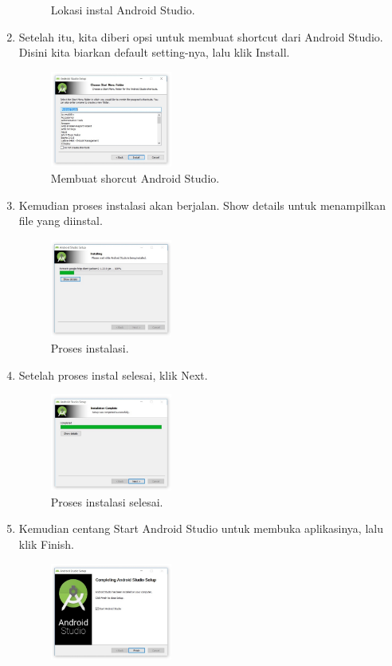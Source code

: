 \begin{enumerate}
\begin{figure}[H]
		\centering
		\caption{Lokasi instal Android Studio.}
	\end{figure}
	\item Setelah itu, kita diberi opsi untuk membuat shortcut dari Android Studio. Disini kita biarkan default setting-nya, lalu klik Install.
	\begin{figure}[H]
		\includegraphics[width=4cm]{figures/installas/4.jpg}
		\centering
		\caption{Membuat shorcut Android Studio.}
	\end{figure}
	\item Kemudian proses instalasi akan berjalan. Show details untuk menampilkan file yang diinstal.
	\begin{figure}[H]
		\includegraphics[width=4cm]{figures/installas/5.jpg}
		\centering
		\caption{Proses instalasi.}
	\end{figure}
	\item Setelah proses instal selesai, klik Next.
	\begin{figure}[H]
		\includegraphics[width=4cm]{figures/installas/6.jpg}
		\centering
		\caption{Proses instalasi selesai.}
	\end{figure}
	\item Kemudian centang Start Android Studio untuk membuka aplikasinya, lalu klik Finish.
	\begin{figure}[H]
		\includegraphics[width=4cm]{figures/installas/7.jpg}

\end{figure}
\end{enumerate}
